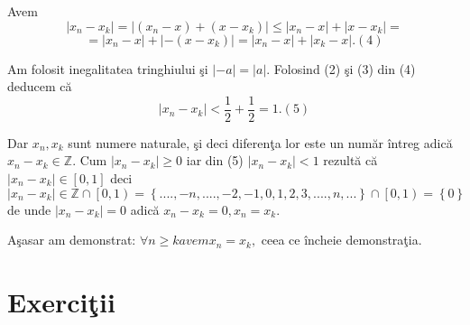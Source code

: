 \documentclass[a4paper,12pt,oneside]{report}
\begin{document}
Avem 
\begin{displaymath}
  \left | x_{n}-x_{k} \right |= \left | (x_{n}-x)+(x-x_{k}) \right |\leq \left | x_{n}-x \right |+\left | x-x_{k} \right |= 
\end{displaymath}
\begin{displaymath}
  =\left | x_{n}-x \right |+ \left | -(x-x_{k}) \right |= \left | x_{n}-x \right |+ \left | x_{k} -x\right |. (4)
\end{displaymath}



Am folosit inegalitatea tringhiului \c si \(\left | -a \right |= \left | a \right |\). Folosind (2) \c si (3) din (4) deducem c\u a 
\begin{displaymath}
  \left | x_{n}-x_{k} \right |< \frac{1}{2}+ \frac{1}{2}= 1. (5) 
\end{displaymath}


Dar \(x_{n}, x_{k}\) sunt numere naturale, \c si deci diferen\c ta lor este un num\u ar \^ intreg adic\u a \(x_{n}- x_{k}\in \mathbb{Z}\). Cum \(\left |x_{n}- x_{k} \right |\geq 0\) iar din (5) \(\left |x_{n}- x_{k} \right |< 1\) rezult\u a c\u a \(\left |x_{n}- x_{k} \right |\in \left [ 0,1 \right ]\) deci \(\left |x_{n}- x_{k} \right |\in\mathbb{Z}\cap \left [ 0,1 \right)= \left \{ ....,-n ,....,-2,-1,0,1,2,3,....,n,... \right \}\cap \left [ 0,1 \right )= \left \{ 0 \right \}\) de unde \(\left | x_{n}-x_{k} \right |=0\) adic\u a \(x_{n}-x_{k}=0,x_{n}=x_{k}.\) 

A\c sasar am demonstrat: \(\forall n\geq k avem x_{n}=x_{k},\) ceea ce \^ incheie demonstra\c tia. 

\section{Exerci\c tii}
\end{document}
